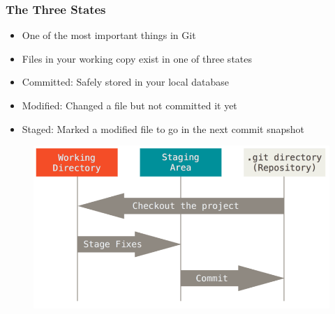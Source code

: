 \documentclass{beamer}
\begin{document}
\begin{frame}
	\frametitle{The Three States}
	\begin{itemize}
		\item{One of the most important things in Git}
		\item{Files in your working copy exist in one of three states}
		\item{Committed: Safely stored in your local database}
		\item{Modified: Changed a file but not committed it yet}
		\item{Staged: Marked a modified file to go in the next commit snapshot}
	\end{itemize}
	\begin{figure}
		\includegraphics[scale=0.25]{The_Three_States-0.png}
	\end{figure}

\end{frame}
\end{document}
